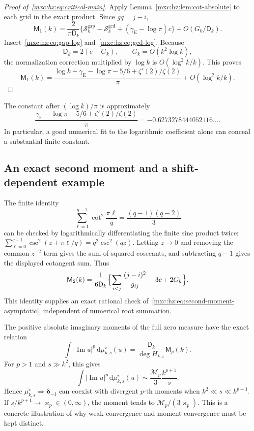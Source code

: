 \documentclass[11pt]{article}
\numberwithin{equation}{section}
\theoremstyle{definition}
\theoremstyle{remark}
\newcommand{\dd}{\,\mathrm d}
\newcommand{\hzmu}{\mu^{\mathrm z}}
\newcommand{\gE}{\gamma_{\mathrm E}}
\begin{document}
\begin{proof}[Proof of~\eqref{mxc:hz:eq:critical-main}]
Apply Lemma~\ref{mxc:hz:lem:cot-absolute} to each grid in the exact
product. Since $gq=j-i$,
\[
 \mathsf M_1(k)=\frac{2}{\pi\mathsf D_k}
     \bigl\{\mathcal S^{\mathrm{gap}}_k-\mathcal S^{\gcd}_k
               +(\gE-\log\pi)c\bigr\}+O(G_k/\mathsf D_k).
\]
Insert~\eqref{mxc:hz:eq:gap-log} and~\eqref{mxc:hz:eq:gcd-log}. Because
\[
 \mathsf D_k=2(c-G_k),\qquad G_k=O(k^2\log k),
\]
the normalization correction multiplied by $\log k$ is $O(\log^2k/k)$.
This proves
\[
 \mathsf M_1(k)=\frac{\log k+\gE-\log\pi-5/6+\zeta'(2)/\zeta(2)}{\pi}
               +O(\log^2k/k).
\]
\end{proof}

The constant after $(\log k)/\pi$ is approximately
\begin{equation}\label{mxc:hz:eq:critical-constant}
 \frac{\gE-\log\pi-5/6+\zeta'(2)/\zeta(2)}{\pi}
 =-0.6273278444052116\ldots.
\end{equation}
In particular, a good numerical fit to the logarithmic coefficient alone
can conceal a substantial finite constant.

\subsection{An exact second moment and a shift-dependent example}

The finite identity
\[
 \sum_{\ell=1}^{q-1}\cot^2\frac{\pi\ell}{q}=\frac{(q-1)(q-2)}3
\]
can be checked by logarithmically differentiating the finite sine product
twice: $\sum_{\ell=0}^{q-1}\csc^2(z+\pi\ell/q)=q^2\csc^2(qz)$. Letting
$z\to0$ and removing the common $z^{-2}$ term gives the sum of squared
cosecants, and subtracting $q-1$ gives the displayed cotangent sum. Thus
\begin{equation}\label{mxc:hz:eq:second-moment-exact}
 \mathsf M_2(k)=\frac1{6\mathsf D_k}
   \Bigl\{\sum_{i<j}\frac{(j-i)^2}{g_{ij}}-3c+2G_k\Bigr\}.
\end{equation}
This identity supplies an exact rational check
of~\eqref{mxc:hz:eq:second-moment-asymptotic}, independent of numerical
root summation.

The positive absolute imaginary moments of the full zero measure have the
exact relation
\begin{equation}\label{mxc:hz:eq:full-moment}
 \int|\operatorname{Im}u|^p\dd\hzmu_{k,s}(u)
       =\frac{\mathsf D_k}{\deg H_{k,s}}\mathsf M_p(k).
\end{equation}
For $p>1$ and $s\gg k^2$, this gives
\[
 \int|\operatorname{Im}u|^p\dd\hzmu_{k,s}(u)
       \sim\frac{\mathcal M_p}{3}\frac{k^{p+1}}s.
\]
Hence $\hzmu_{k,s}\Longrightarrow\boldsymbol\delta_{-1}$ can coexist with
divergent $p$-th moments when $k^2\ll s\ll k^{p+1}$. If
$s/k^{p+1}\to\varkappa_p\in(0,\infty)$, the moment tends to
$\mathcal M_p/(3\varkappa_p)$. This is a concrete illustration of why weak
convergence and moment convergence must be kept distinct.
\end{document}
